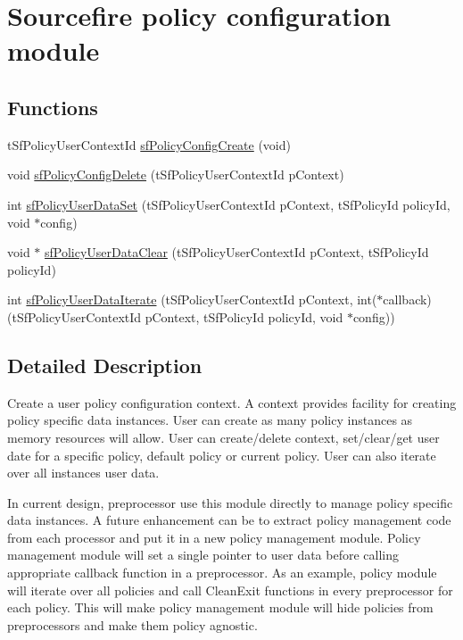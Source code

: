 \hypertarget{group__sfPolicyConfig}{
\section{Sourcefire policy configuration module}
\label{group__sfPolicyConfig}
}
\subsection*{Functions}
\begin{DoxyCompactItemize}
\item 
tSfPolicyUserContextId \hyperlink{group__sfPolicyConfig_gac62cd5838bee4a9d3f40561eae920cdd}{sfPolicyConfigCreate} (void)
\item 
void \hyperlink{group__sfPolicyConfig_ga189d09ed6d1203ebace6ea2c2aafc1b8}{sfPolicyConfigDelete} (tSfPolicyUserContextId pContext)
\item 
int \hyperlink{group__sfPolicyConfig_ga8e14fd83397b9bbb14568070183db80b}{sfPolicyUserDataSet} (tSfPolicyUserContextId pContext, tSfPolicyId policyId, void $\ast$config)
\item 
void $\ast$ \hyperlink{group__sfPolicyConfig_gae8f2ae426b1f1a50eabfade6d22c2c85}{sfPolicyUserDataClear} (tSfPolicyUserContextId pContext, tSfPolicyId policyId)
\item 
int \hyperlink{group__sfPolicyConfig_ga3f3ab9314d29d2ee2a8285289b388f17}{sfPolicyUserDataIterate} (tSfPolicyUserContextId pContext, int($\ast$callback)(tSfPolicyUserContextId pContext, tSfPolicyId policyId, void $\ast$config))
\end{DoxyCompactItemize}


\subsection{Detailed Description}
Create a user policy configuration context. A context provides facility for creating policy specific data instances. User can create as many policy instances as memory resources will allow. User can create/delete context, set/clear/get user date for a specific policy, default policy or current policy. User can also iterate over all instances user data.

In current design, preprocessor use this module directly to manage policy specific data instances. A future enhancement can be to extract policy management code from each processor and put it in a new policy management module. Policy management module will set a single pointer to user data before calling appropriate callback function in a preprocessor. As an example, policy module will iterate over all policies and call CleanExit functions in every preprocessor for each policy. This will make policy management module will hide policies from preprocessors and make them policy agnostic. 

